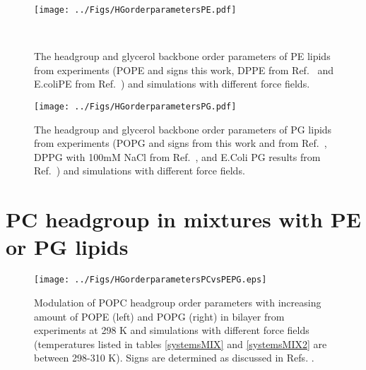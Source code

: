 \documentclass[journal=jpcbfk]{achemso}
\begin{document}

\begin{figure}[]
  \centering
  \texttt{[image: ../Figs/HGorderparametersPE.pdf]}
  \caption{\label{HGorderParametersPE}
    The headgroup and glycerol backbone order parameters of PE lipids
    from experiments (POPE and signs this work, DPPE from Ref.~
    and E.coliPE from Ref.~) and simulations with different force fields.
  }
   \\
\end{figure}

\begin{figure}[!h]
  \centering
  \texttt{[image: ../Figs/HGorderparametersPG.pdf]}
  \caption{\label{HGorderParametersPOPG}
    The headgroup and glycerol backbone order parameters of PG lipids
    from experiments (POPG and signs from this work and from Ref.~, %
    DPPG with 100mM NaCl from Ref.~,%
    and E.Coli PG results from Ref.~)
    and simulations with different force fields.
  }
\end{figure}

\clearpage

\section{PC headgroup in mixtures with PE or PG lipids}
\begin{figure*}[]
  \centering
  \texttt{[image: ../Figs/HGorderparametersPCvsPEPG.eps]}
  \caption{\label{HGorderparametersPCvsPEPG}
    Modulation of POPC headgroup order parameters with increasing amount of POPE (left) and POPG (right) in bilayer
    from experiments at 298 K \cite{scherer87,macdonald87} and simulations with different force fields
    (temperatures listed in tables \ref{systemsMIX} and \ref{systemsMIX2} are between 298-310 K).
    Signs are determined as discussed in Refs. .
  }
\end{figure*}
\end{document}
